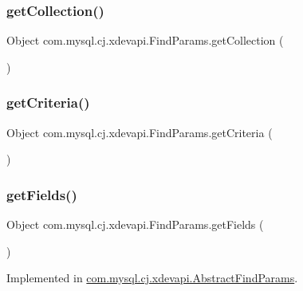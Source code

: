 \subsubsection{\texorpdfstring{get\+Collection()}{getCollection()}}
{\footnotesize\ttfamily Object com.\+mysql.\+cj.\+xdevapi.\+Find\+Params.\+get\+Collection (\begin{DoxyParamCaption}{ }\end{DoxyParamCaption})}

\mbox{\label{interfacecom_1_1mysql_1_1cj_1_1xdevapi_1_1_find_params_ad8156e94ab6e273a66b08240843cb12a}} 
\subsubsection{\texorpdfstring{get\+Criteria()}{getCriteria()}}
{\footnotesize\ttfamily Object com.\+mysql.\+cj.\+xdevapi.\+Find\+Params.\+get\+Criteria (\begin{DoxyParamCaption}{ }\end{DoxyParamCaption})}

\mbox{\label{interfacecom_1_1mysql_1_1cj_1_1xdevapi_1_1_find_params_aac3a5fc922164eb993ace388ab96ea68}} 
\subsubsection{\texorpdfstring{get\+Fields()}{getFields()}}
{\footnotesize\ttfamily Object com.\+mysql.\+cj.\+xdevapi.\+Find\+Params.\+get\+Fields (\begin{DoxyParamCaption}{ }\end{DoxyParamCaption})}



Implemented in \mbox{\hyperlink{classcom_1_1mysql_1_1cj_1_1xdevapi_1_1_abstract_find_params_aec128ea6b15a2530e3bfb119bab740dc}{com.\+mysql.\+cj.\+xdevapi.\+Abstract\+Find\+Params}}.

